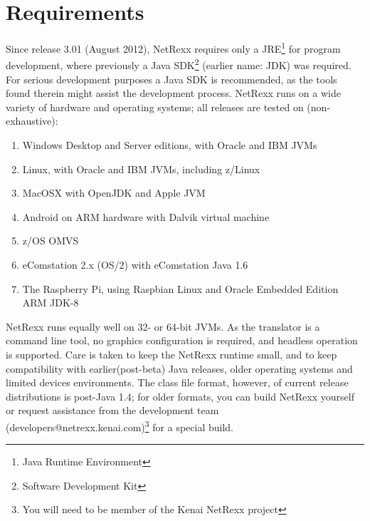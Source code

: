 \chapter{Requirements}
Since release 3.01 (August 2012), NetRexx requires only a
JRE\footnote{Java Runtime Environment} for program development, where previously a
Java SDK\footnote{Software Development Kit} (earlier name: JDK) was required. For serious development
purposes a Java SDK is recommended, as the tools found therein might
assist the development process. NetRexx runs on a wide variety of
hardware and operating systems; all releases are tested on (non-exhaustive):
\begin{enumerate}
\item Windows Desktop and Server editions, with Oracle and IBM JVMs
\item Linux, with Oracle and IBM JVMs, including z/Linux
\item MacOSX with OpenJDK and Apple JVM
\item Android on ARM hardware with Dalvik virtual machine
\item z/OS OMVS
\item eComstation 2.x (OS/2) with eComstation Java 1.6
\item The Raspberry Pi, using Raspbian Linux and Oracle Embedded
  Edition ARM JDK-8
\end{enumerate}
NetRexx runs equally well on 32- or 64-bit JVMs. As the translator is
a command line tool, no graphics configuration is required, and
headless operation is supported. Care is taken to keep the NetRexx runtime small, and to keep
compatibility with earlier(post-beta) Java releases, older operating systems and
limited devices environments. The class file format, however, of
current release distributions is post-Java 1.4; for older formats, you
can build NetRexx yourself or request assistance from the development
team (\nolinebreak[4]developers@netrexx.kenai.com)\footnote{You will
  need to be member of the Kenai NetRexx project} for a special build.

